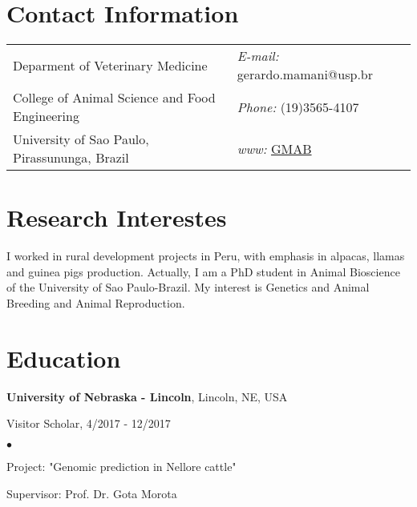 \documentclass[margin,line,10pt]{res}
\newenvironment{list1}{
  \begin{list}{\ding{113}}{%
      \setlength{\itemsep}{0in}
      \setlength{\parsep}{0in} \setlength{\parskip}{0in}
      \setlength{\topsep}{0in} \setlength{\partopsep}{0in} 
      \setlength{\leftmargin}{0.17in}}}{\end{list}}
\newenvironment{list2}{
  \begin{list}{$\bullet$}{%
      \setlength{\itemsep}{0in}
      \setlength{\parsep}{0in} \setlength{\parskip}{0in}
      \setlength{\topsep}{0in} \setlength{\partopsep}{0in} 
      \setlength{\leftmargin}{0.2in}}}{\end{list}}
\begin{document}

\begin{resume}
\section{\sc Contact Information}
\vspace{.05in}
\begin{tabular}{@{}p{3in}p{4in}}
Deparment of Veterinary Medicine                & \hspace{2.2cm} {\it E-mail:} gerardo.mamani@usp.br\\       
College of Animal Science and Food Engineering  & \hspace{2.2cm} {\it Phone:} (19)3565-4107\\  
University of Sao Paulo, Pirassununga, Brazil   & \hspace{2.2cm} {\it www:} \textcolor{black}{\href{http://www.usp.br/gmab/}{GMAB} }\\  

\end{tabular}

\vspace{0.3cm}
\section{\sc Research Interestes}
I worked in rural development projects in Peru, with emphasis in alpacas, llamas and guinea pigs production. Actually, I am a PhD student in Animal Bioscience of the University of Sao Paulo-Brazil. My interest is Genetics and Animal Breeding and Animal Reproduction. 
 
\section{\sc Education}

{\bf University of Nebraska - Lincoln}, Lincoln, NE, USA\\
\vspace*{-.1in}
\begin{list1}
\item[] Visitor Scholar, 4/2017 - 12/2017
\begin{list2}
\vspace*{.05in}
\item Project: "Genomic prediction in Nellore cattle" 
\item Supervisor: Prof. Dr. Gota Morota
\end{list2}
\vspace*{.05in}
\end{list1}


\end{resume}
\end{document}
